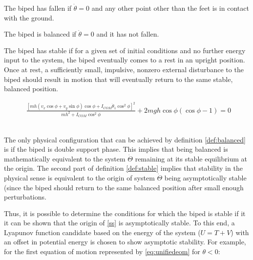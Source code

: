 \hrulefill

\begin{definition} \label{def:fallen}
	The biped has fallen if $\dot{\theta} = 0$ and any other point other than the feet is in contact with the ground. 
\end{definition}

\begin{definition} \label{def:balanced}
	The biped is balanced if $\dot{\theta} = 0$ and it has not fallen. 
\end{definition}

\begin{definition} \label{def:stable}
	The biped has stable if for a given set of initial conditions and no further energy input to the system, the biped eventually comes to a rest in an upright position. Once at rest, a sufficiently small, impulsive, nonzero external disturbance to the biped should result in motion that will eventually return to the same stable, balanced position. 
\end{definition}

\hrulefill

\begin{figure}[!t]
	\begin{equation} \label{eq:fpe}
	\begin{aligned}
		\frac{{{{\left[ {mh({v_x}\cos \phi  + {v_y}\sin \phi )\cos \phi  + {I_{COM}}{{\dot \theta }_1}{{\cos }^2}\phi } \right]}^2}}}{{m{h^2} + {I_{COM}}{{\cos }^2}\phi }} + 2mgh\cos \phi (\cos \phi  - 1) = 0
	\end{aligned}
	\end{equation}
	\\ 
	\hrulefill
\end{figure}

The only physical configuration that can be achieved by definition \ref{def:balanced} is if the biped is double support phase. This implies that being balanced is mathematically equivalent to the system $\dot{\Theta}$ remaining at its stable equilibrium at the origin. The second part of definition \ref{def:stable} implies that stability in the physical sense is equivalent to the origin of system $\dot{\Theta}$ being asymptotically stable (since the biped should return to the same balanced position after small enough perturbations.

Thus, it is possible to determine the conditions for which the biped is stable if it it can be shown that the origin of \eqref{ss} is asymptotically stable. To this end, a Lyapunov function candidate based on the energy of the system ($U = T + V$) with an offset in potential energy is chosen to show asymptotic stability. For example, for the first equation of motion represented by \eqref{eq:unifiedeom} for $\theta < 0$: 

